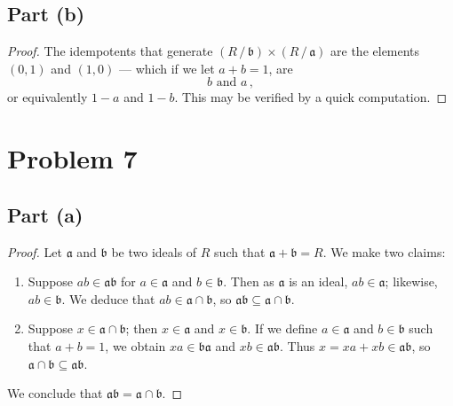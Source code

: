 \documentclass[11pt]{article}
\begin{document}

\subsection*{Part (b)}

\begin{proof}
  The idempotents that generate $(R \, / \, \mathfrak{b}) \times (R \, / \, \mathfrak{a})$ are the elements $(0, 1)$ and $(1, 0)$ --- which if we let $a + b = 1$, are
  \[
    \boxed{\text{$b$ and $a$}} \,,
  \]
  or equivalently $1 - a$ and $1 - b$.  This may be verified by a quick computation.
\end{proof}


\section{Problem 7}


\subsection*{Part (a)}

\begin{proof}
  Let $\mathfrak{a}$ and $\mathfrak{b}$ be two ideals of $R$ such that $\mathfrak{a} + \mathfrak{b} = R$. We make two claims:
  \begin{enumerate}
    \item Suppose $ab \in \mathfrak{ab}$ for $a \in \mathfrak{a}$ and $b \in \mathfrak{b}$. Then as $\mathfrak{a}$ is an ideal, $ab \in \mathfrak{a}$; likewise, $ab \in \mathfrak{b}$. We deduce that $ab \in \mathfrak{a} \cap \mathfrak{b}$, so $\mathfrak{ab} \subseteq \mathfrak{a} \cap \mathfrak{b}$.
    \item Suppose $x \in \mathfrak{a} \cap \mathfrak{b}$; then $x \in \mathfrak{a}$ and $x \in \mathfrak{b}$. If we define $a \in \mathfrak{a}$ and $b \in \mathfrak{b}$ such that $a + b = 1$, we obtain $xa \in \mathfrak{ba}$ and $xb \in \mathfrak{ab}$. Thus $x = xa + xb \in \mathfrak{ab}$, so $\mathfrak{a} \cap \mathfrak{b} \subseteq \mathfrak{ab}$.
  \end{enumerate}
  We conclude that $\mathfrak{ab} = \mathfrak{a} \cap \mathfrak{b}$.
\end{proof}

\end{document}
